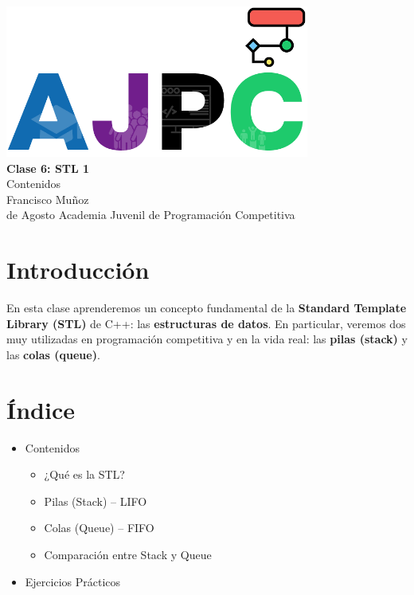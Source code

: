 \documentclass{article}
\newcommand{\documentTitle}{Clase 6: STL 1}
\newcommand{\documentSubtitle}{Contenidos}
\newcommand{\documentAuthor}{Francisco Muñoz}
\newcommand{\documentDate}{30 de Agosto}
\begin{document}
\thispagestyle{empty}
\AddToShipoutPictureBG*{}
\begin{center}
    \vspace*{2cm}
    \includegraphics[width=0.75\textwidth]{logo.png} \\[1.5cm]
    {\Huge \textbf{\documentTitle}} \\[0.5cm]
    {\Large \documentSubtitle} \\[1.5cm]
    {\large \documentAuthor} \\[0.5cm]
    {\large \space \space \documentDate}
    \vfill
    {\large Academia Juvenil de Programación Competitiva}
\end{center}
\newpage

\section{Introducción}

En esta clase aprenderemos un concepto fundamental de la \textbf{Standard Template Library (STL)} de C++: las \textbf{estructuras de datos}. 
En particular, veremos dos muy utilizadas en programación competitiva y en la vida real: las \textbf{pilas (stack)} y las \textbf{colas (queue)}.

\section{Índice}

\begin{itemize}
    \item Contenidos
    \begin{itemize}
        \item ¿Qué es la STL?
        \item Pilas (Stack) – LIFO
        \item Colas (Queue) – FIFO
        \item Comparación entre Stack y Queue
    \end{itemize}
    \item Ejercicios Prácticos
\end{itemize}
\end{document}
